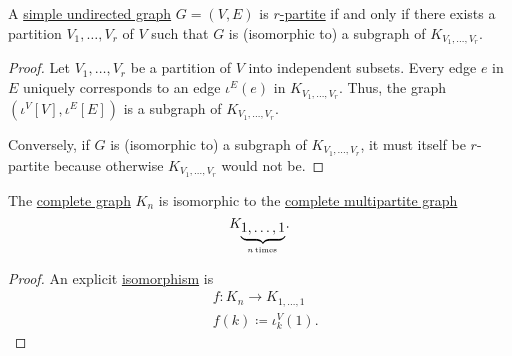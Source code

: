 \begin{proposition}\label{thm:complete_multipartite_subgraphs}
  A \hyperref[def:undirected_graph]{simple undirected graph} \( G = (V, E) \) is \hyperref[def:multipartite_graph]{\( r \)-partite} if and only if there exists a partition \( V_1, \ldots, V_r \) of \( V \) such that \( G \) is (isomorphic to) a subgraph of \( K_{V_1, \ldots, V_r} \).
\end{proposition}
\begin{proof}
  \SufficiencySubProof Let \( V_1, \ldots, V_r \) be a partition of \( V \) into independent subsets. Every edge \( e \) in \( E \) uniquely corresponds to an edge \( \iota^E(e) \) in \( K_{V_1, \ldots, V_r} \). Thus, the graph \( (\iota^V[V], \iota^E[E]) \) is a subgraph of \( K_{V_1, \ldots, V_r} \).

  \NecessitySubProof Conversely, if \( G \) is (isomorphic to) a subgraph of \( K_{V_1, \ldots, V_r} \), it must itself be \( r \)-partite because otherwise \( K_{V_1, \ldots, V_r} \) would not be.
\end{proof}

\begin{proposition}\label{thm:small_complete_multipartite_graph}
  The \hyperref[def:complete_graph]{complete graph} \( K_n \) is isomorphic to the \hyperref[def:complete_multipartite_graph]{complete multipartite graph}
  \begin{equation*}
    K_{\underbrace{1,\ldots,1}_{n \T*{times}}}.
  \end{equation*}
\end{proposition}
\begin{proof}
  An explicit \hyperref[def:undirected_graph/homomorphism]{isomorphism} is
  \begin{equation*}
    \begin{aligned}
      &f: K_n \to K_{1,\ldots,1} \\
      &f(k) \coloneqq \iota^V_k(1).
    \end{aligned}
  \end{equation*}
\end{proof}

